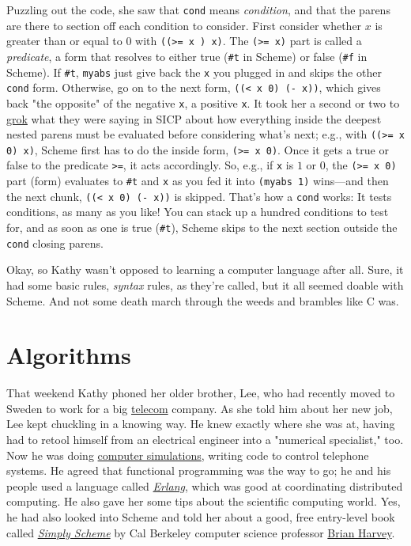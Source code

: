 \documentclass[koma]{article}
\begin{document}
Puzzling out the code, she saw that \texttt{cond} means \emph{condition}, and that the parens are there to section off each condition to consider. First consider whether \(x\) is greater than or equal to \(0\) with \texttt{((>= x ) x)}. The \texttt{(>= x)} part is called a \emph{predicate}, a form that resolves to either true (\texttt{\#t} in Scheme) or false (\texttt{\#f} in Scheme). If \texttt{\#t}, \texttt{myabs} just give back the \texttt{x} you plugged in and skips the other \texttt{cond} form. Otherwise, go on to the next form, \texttt{((< x 0) (- x))}, which gives back "the opposite" of the negative \texttt{x}, a positive \texttt{x}. It took her a second or two to \href{https://en.wikipedia.org/wiki/Grok}{grok} what they were saying in SICP about how everything inside the deepest nested parens must be evaluated before considering what's next; e.g., with \texttt{((>= x 0) x)}, Scheme first has to do the inside form, \texttt{(>= x 0)}. Once it gets a true or false to the predicate \texttt{>=}, it acts accordingly. So, e.g., if \texttt{x} is \(1\) or \(0\), the \texttt{(>= x 0)} part (form) evaluates to \texttt{\#t} and \texttt{x} as you fed it into \texttt{(myabs 1)} wins---and then the next chunk, \texttt{((< x 0) (- x))} is skipped. That's how a \texttt{cond} works: It tests conditions, as many as you like! You can stack up a hundred conditions to test for, and as soon as one is true (\texttt{\#t}), Scheme skips to the next section outside the \texttt{cond} closing parens.

Okay, so Kathy wasn't opposed to learning a computer language after all. Sure, it had some basic rules, \emph{syntax} rules, as they're called, but it all seemed doable with Scheme. And not some death march through the weeds and brambles like C was.

\section{Algorithms}
\label{sec:orgheadline5}

That weekend Kathy phoned her older brother, Lee, who had recently moved to Sweden to work for a big \href{https://en.wikipedia.org/wiki/Telecommunication}{telecom} company. As she told him about her new job, Lee kept chuckling in a knowing way. He knew exactly where she was at, having had to retool himself from an electrical engineer into a "numerical specialist," too. Now he was doing \href{https://en.wikipedia.org/wiki/Computer_simulation}{computer simulations}, writing code to control telephone systems. He agreed that functional programming was the way to go; he and his people used a language called \emph{\href{https://en.wikipedia.org/wiki/Erlang_(programming_language)}{Erlang}}, which was good at coordinating distributed computing. He also gave her some tips about the scientific computing world. Yes, he had also looked into Scheme and told her about a good, free entry-level book called \emph{\href{https://www.cs.berkeley.edu/~bh/ss-toc2.html}{Simply Scheme}} by Cal Berkeley computer science professor \href{http://www.cs.berkeley.edu/~bh/}{Brian Harvey}.
\end{document}
